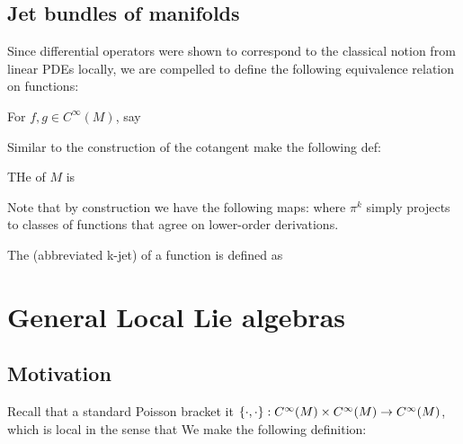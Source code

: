 \documentclass{article}
\begin{document}
\subsection{Jet bundles of manifolds}
Since differential operators were shown to correspond to the classical notion from linear PDEs locally, we are compelled to define the following equivalence relation on functions: 

\begin{definition}
For $f,g \in C^\infty(M)$, say 
\end{definition}

Similar to the construction of the cotangent make the following def: 

\begin{definition}
THe  of $M$ is 
\end{definition}

Note that by construction we have the following maps: 
where $\pi^k$ simply projects to classes of functions that agree on lower-order derivations. 
\begin{definition}
The  (abbreviated k-jet) of a function is defined as 
\end{definition}

\section{General Local Lie algebras}

\subsection{Motivation}
Recall that a standard Poisson bracket it $\acomm[\cdot]{\cdot} : C^\infty(M) \times C^\infty(M) \to C^\infty(M)$, which is local in the sense that 
We make the following definition:
\end{document}
